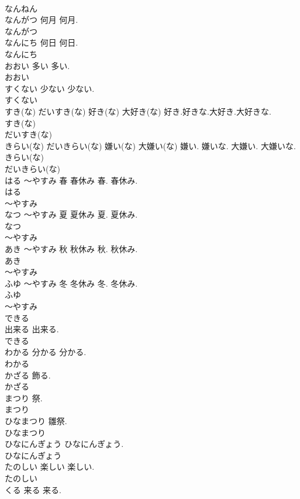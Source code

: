 \documentclass[8pt]{extreport}
\begin{document}
\begin{CJK}{UTF8}{min}
\\	なんねん
\\	なんがつ	何月	何月.	
\\	なんがつ
\\	なんにち	何日	何日.	
\\	なんにち
\\	おおい	多い	多い.	
\\	おおい
\\	すくない	少ない	少ない.	
\\	すくない
\\	すき(な) だいすき(な)	好き(な) 大好き(な)	好き.好きな.大好き.大好きな.	
\\	すき(な)
\\	だいすき(な)
\\	きらい(な) だいきらい(な)	嫌い(な) 大嫌い(な)	嫌い. 嫌いな. 大嫌い. 大嫌いな.	
\\	きらい(な)
\\	だいきらい(な)
\\	はる ～やすみ	春 春休み	春. 春休み.	
\\	はる
\\	～やすみ
\\	なつ ～やすみ	夏 夏休み	夏. 夏休み.	
\\	なつ
\\	～やすみ
\\	あき ～やすみ	秋 秋休み	秋. 秋休み.	
\\	あき
\\	～やすみ
\\	ふゆ ～やすみ	冬 冬休み	冬. 冬休み.	
\\	ふゆ
\\	～やすみ
\\	できる	
\\	出来る	出来る.	
\\	できる
\\	わかる	分かる	分かる.	
\\	わかる
\\	かざる		飾る.	
\\	かざる
\\	まつり		祭.	
\\	まつり
\\	ひなまつり		雛祭.	
\\	ひなまつり
\\	ひなにんぎょう		ひなにんぎょう.	
\\	ひなにんぎょう
\\	たのしい	楽しい	楽しい.	
\\	たのしい
\\	くる	来る	来る.	

\end{CJK}
\end{document}
